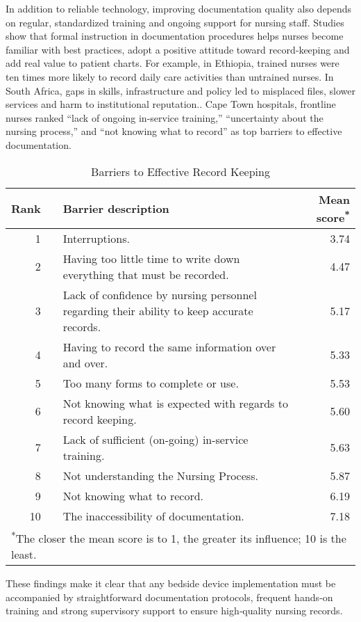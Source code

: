 \documentclass[a4paper,11pt]{article}
\begin{document}
\begin{itemize}
In addition to reliable technology, improving documentation quality also depends on regular, standardized training and ongoing support for nursing staff. Studies show that formal instruction in documentation procedures helps nurses become familiar with best practices, adopt a positive attitude toward record‑keeping and add real value to patient charts. \cite{PDFStructuralProcess} For example, in Ethiopia, trained nurses were ten times more likely to record daily care activities than untrained nurses.\cite{PDFNursingDocumentation} In South Africa, gaps in skills, infrastructure and policy led to misplaced files, slower services and harm to institutional reputation.\cite{maruthaRoleMedicalRecords2017}. Cape Town hospitals, frontline nurses ranked “lack of ongoing in-service training,” “uncertainty about the nursing process,” and “not knowing what to record” as top barriers to effective documentation. \cite{olivierRecordKeepingSelfreported2010}


\begin{table}[ht]
  \centering
  \caption{Barriers to Effective Record Keeping}
  \label{tab:barriers}
  \begin{tabular}{rlp{10cm}r}
    \toprule
    \textbf{Rank} & & \textbf{Barrier description} & \textbf{Mean score\textsuperscript{*}} \\
    \midrule
    1  & & Interruptions. & 3.74 \\
    2  & & Having too little time to write down everything that must be recorded. & 4.47 \\
    3  & & Lack of confidence by nursing personnel regarding their ability to keep accurate records. & 5.17 \\
    4  & & Having to record the same information over and over. & 5.33 \\
    5  & & Too many forms to complete or use. & 5.53 \\
    6  & & Not knowing what is expected with regards to record keeping. & 5.60 \\
    7  & & Lack of sufficient (on-going) in-service training. & 5.63 \\
    8  & & Not understanding the Nursing Process. & 5.87 \\
    9  & & Not knowing what to record. & 6.19 \\
    10 & & The inaccessibility of documentation. & 7.18 \\
    \bottomrule
    \multicolumn{4}{l}{\textsuperscript{*}The closer the mean score is to 1, the greater its influence; 10 is the least.}
  \end{tabular}
\end{table}



These findings make it clear that any bedside device implementation must be accompanied by straightforward documentation protocols, frequent hands‑on training and strong supervisory support to ensure high‑quality nursing records. 

  
\end{itemize}
\end{document}
